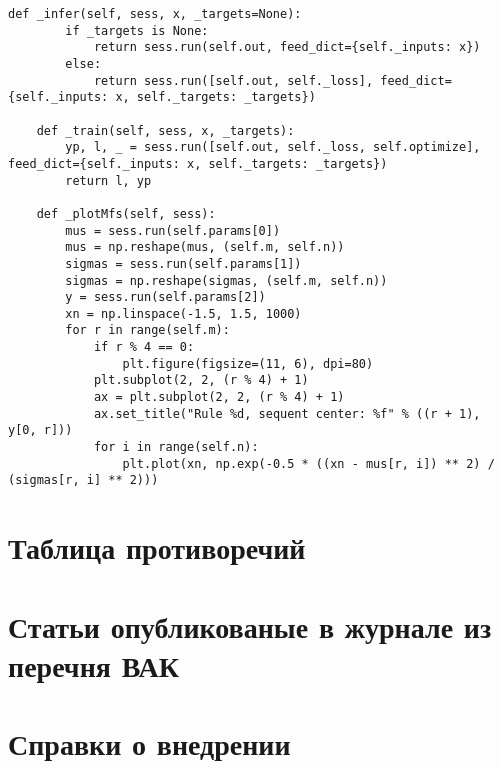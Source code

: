 \begin{ListingEnv}[!h]
\begin{lstlisting}[language={[ISO]PYTHON}]
    def _infer(self, sess, x, _targets=None):
        if _targets is None:
            return sess.run(self.out, feed_dict={self._inputs: x})
        else:
            return sess.run([self.out, self._loss], feed_dict={self._inputs: x, self._targets: _targets})

    def _train(self, sess, x, _targets):
        yp, l, _ = sess.run([self.out, self._loss, self.optimize], feed_dict={self._inputs: x, self._targets: _targets})
        return l, yp

    def _plotMfs(self, sess):
        mus = sess.run(self.params[0])
        mus = np.reshape(mus, (self.m, self.n))
        sigmas = sess.run(self.params[1])
        sigmas = np.reshape(sigmas, (self.m, self.n))
        y = sess.run(self.params[2])
        xn = np.linspace(-1.5, 1.5, 1000)
        for r in range(self.m):
            if r % 4 == 0:
                plt.figure(figsize=(11, 6), dpi=80)
            plt.subplot(2, 2, (r % 4) + 1)
            ax = plt.subplot(2, 2, (r % 4) + 1)
            ax.set_title("Rule %d, sequent center: %f" % ((r + 1), y[0, r]))
            for i in range(self.n):
                plt.plot(xn, np.exp(-0.5 * ((xn - mus[r, i]) ** 2) / (sigmas[r, i] ** 2)))
    \end{lstlisting}
\end{ListingEnv}%
\section{Таблица противоречий}\label{app:B2}


\section{Статьи опубликованые в журнале из перечня ВАК}\label{app:B3}
\clearpage
{}








\section{Справки о внедрении}\label{app:B4}
\clearpage
{}



